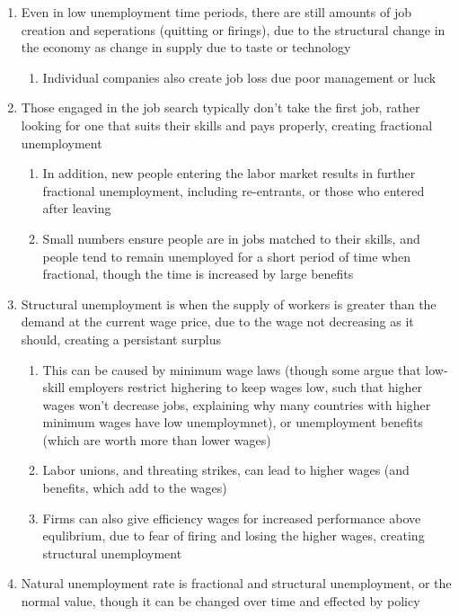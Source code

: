 \documentclass[11 pt, twoside]{article}
\begin{document}
\begin{enumerate}
\item Even in low unemployment time periods, there are still amounts of job creation and seperations (quitting or firings), due to the structural change in the economy as change in supply due to taste or technology
\begin{enumerate}
\item Individual companies also create job loss due poor management or luck
\end{enumerate}
\item Those engaged in the job search typically don't take the first job, rather looking for one that suits their skills and pays properly, creating fractional unemployment
\begin{enumerate}
\item In addition, new people entering the labor market results in further fractional unemployment, including re-entrants, or those who entered after leaving
\item Small numbers ensure people are in jobs matched to their skills, and people tend to remain unemployed for a short period of time when fractional, though the time is increased by large benefits
\end{enumerate}
\item Structural unemployment is when the supply of workers is greater than the demand at the current wage price, due to the wage not decreasing as it should, creating a persistant surplus
\begin{enumerate}
\item This can be caused by minimum wage laws (though some argue that low-skill employers restrict highering to keep wages low, such that higher wages won't decrease jobs, explaining why many countries with higher minimum wages have low unemploymnet), or unemployment benefits (which are worth more than lower wages)
\item Labor unions, and threating strikes, can lead to higher wages (and benefits, which add to the wages)
\item Firms can also give efficiency wages for increased performance above equlibrium, due to fear of firing and losing the higher wages, creating structural unemployment
\end{enumerate}
\item Natural unemployment rate is fractional and structural unemployment, or the normal value, though it can be changed over time and effected by policy
\begin{enumerate}

\end{enumerate}
\end{enumerate}
\end{document}

